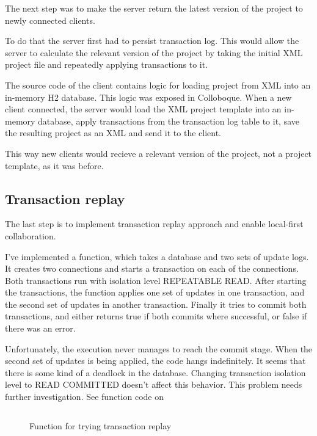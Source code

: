 \documentclass[a4paper, 11pt, oneside]{article}
\theoremstyle{definition}
\begin{document}
The next step was to make the server return the latest version of the project to newly connected clients.

To do that the server first had to persist transaction log. This would allow the server to calculate the relevant version of the project by taking the initial XML project file and repeatedly applying transactions to it.

The source code of the client contains logic for loading project from XML into an in-memory H2 database. This logic was exposed in Colloboque. When a new client connected, the server would load the XML project template into an in-memory database, apply transactions from the transaction log table to it, save the resulting project as an XML and send it to the client. 

This way new clients would recieve a relevant version of the project, not a project template, as it was before. 

\subsection{Transaction replay}

The last step is to implement transaction replay approach and enable local-first collaboration.

I've implemented a function, which takes a database and two sets of update logs. It creates two connections and starts a transaction on each of the connections. Both transactions run with isolation level REPEATABLE READ. After starting the transactions, the function applies one set of updates in one transaction, and the second set of updates in another transaction.  Finally it tries to commit both transactions, and either returns true if both commits where successful, or false if there was an error.

Unfortunately, the execution never manages to reach the commit stage. When the second set of updates is being applied, the code hangs indefinitely. It seems that there is some kind of a deadlock in the database. Changing transaction isolation level to READ COMMITTED doesn't affect this behavior. This problem needs further investigation. See function code on 

\begin{figure}
    \inputminted[frame=single,linenos,breaklines]{kotlin}{lst/merge-concurrent-updates.kt}
    \caption{Function for trying transaction replay}
    \label{fig:merge-fun}
\end{figure}

\newpage
\printbibliography
\clearpage
\end{document}
